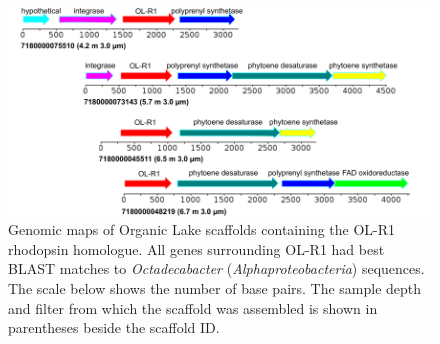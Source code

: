 \begin{figure}
\includegraphics[width=\textwidth]{orglake_figures/OLR1_scaffolds.pdf}
\caption[Genomic maps of Organic Lake scaffolds containing the OL-R1 rhodopsin homologue]{Genomic maps of Organic Lake scaffolds containing the OL-R1 rhodopsin homologue. All genes surrounding OL-R1 had best \ac{BLAST} matches to \emph{Octadecabacter} (\emph{Alphaproteobacteria}) sequences. The scale below shows the number of base pairs. The sample depth and filter from which the scaffold was assembled is shown in parentheses beside the scaffold ID.}
\label{fig:OLR1_scaffolds}

\end{figure}

